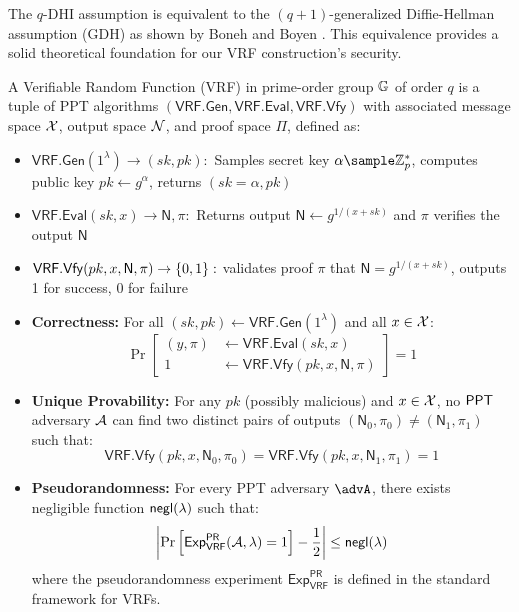 \begin{remark}
The $q$-DHI assumption is equivalent to the $(q+1)$-generalized Diffie-Hellman assumption (GDH) as shown by Boneh and Boyen \cite{kanade_efficient_2004}. This equivalence provides a solid theoretical foundation for our VRF construction's security.
\end{remark}




\begin{definition}
A Verifiable Random Function (VRF) in prime-order group $\mathbb{G}$ of order $q$ is a tuple of PPT algorithms $(\mathsf{VRF.Gen}, \mathsf{VRF.Eval}, \mathsf{VRF.Vfy})$ with associated message space $\mathcal{X}$, output space $\mathcal{N}$, and proof space $\Pi$, defined as:

\begin{itemize}
    \item $\mathsf{VRF.Gen}(1^\lambda) \to (sk, pk):$ Samples secret key $\alpha \sample \Zp^*$, computes public key $pk \gets g^\alpha$, returns $(sk = \alpha, pk)$
    
    \item $\mathsf{VRF.Eval}(sk, x) \to \textsf{N}, \pi:$ Returns output $\textsf{N} \gets g^{1/(x+sk)}$ and $\pi$ verifies the output $\textsf{N}$
    
    \item $\mathsf{VRF.Vfy}(pk, x, \textsf{N}, \pi) \to \{0,1\}:$ validates proof $\pi$ that $\textsf{N} = g^{1/(x+sk)}$, outputs 1 for success, 0 for failure
\end{itemize}
\end{definition}

\begin{itemize}
    \item \textbf{Correctness:} For all $(sk, pk) \gets \mathsf{VRF.Gen}(1^\lambda)$ and all $x \in \mathcal{X}$:
    \[
    \Pr\left[\begin{aligned}
        (y, \pi) &\gets \mathsf{VRF.Eval}(sk, x) \\
        1 &\gets \mathsf{VRF.Vfy}(pk, x, \textsf{N}, \pi)
    \end{aligned}\right] = 1
    \]

    \item \textbf{Unique Provability:} For any $pk$ (possibly malicious) and $x \in \mathcal{X}$, no $\mathsf{PPT}$ adversary $\mathcal{A}$ can find two distinct pairs of outputs $(\textsf{N}_0, \pi_0) \neq (\textsf{N}_1, \pi_1)$ such that:
    \[
    \mathsf{VRF.Vfy}(pk, x, \textsf{N}_0, \pi_0) = \mathsf{VRF.Vfy}(pk, x, \textsf{N}_1, \pi_1) = 1
    \]

    \item \textbf{Pseudorandomness:} For every PPT adversary $\advA$, there exists negligible function ${\mathsf{negl}(\lambda)}$ such that:
    \[
    \left|\Pr\left[\mathsf{Exp}_{\mathsf{VRF}}^{\mathsf{PR}}(\mathcal{A}, \lambda) = 1\right] - \frac{1}{2}\right| \leq {\mathsf{negl}(\lambda)}
    \]
    where the pseudorandomness experiment $\mathsf{Exp}_{\mathsf{VRF}}^{\mathsf{PR}}$ is defined in the standard framework for VRFs.
\end{itemize}


